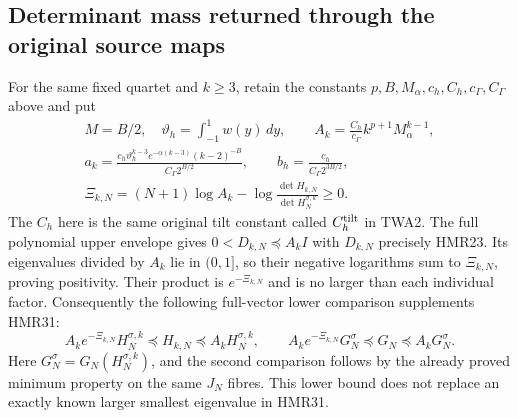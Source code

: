 \documentclass[11pt,a4paper]{article}
\begin{document}
\subsection{Determinant mass returned through the original source maps}

For the same fixed quartet and $k\geq3$, retain the constants
$p,B,M_\alpha,c_h,C_h,c_\Gamma,C_\Gamma$ above and put
\[
\begin{gathered}
 M=B/2,\quad \vartheta_h=\int_{-1}^1w(y)\,dy,\qquad
 A_k=\frac{C_h}{c_\Gamma}k^{p+1}M_\alpha^{k-1},\\
 a_k=\frac{c_h\vartheta_h^{k-3}e^{-\alpha(k-3)}(k-2)^{-B}}
                 {C_\Gamma2^{B/2}},\qquad
 b_h=\frac{c_h}{C_\Gamma2^{3B/2}},\\
 \Xi_{k,N}=(N+1)\log A_k
       -\log\frac{\det H_{k,N}}{\det H_N^{\sigma,k}}\geq0 .
\end{gathered}\tag{HMR36}
\]
The $C_h$ here is the same original tilt constant called
$C_h^{\rm tilt}$ in TWA2. The full polynomial upper envelope
gives $0<D_{k,N}\preceq A_kI$ with $D_{k,N}$ precisely HMR23.
Its eigenvalues divided by $A_k$ lie in $(0,1]$, so their
negative logarithms sum to $\Xi_{k,N}$, proving positivity.
Their product is $e^{-\Xi_{k,N}}$ and is no larger than each
individual factor. Consequently the following full-vector
lower comparison supplements HMR31:
\[
 A_ke^{-\Xi_{k,N}}H_N^{\sigma,k}
 \preceq H_{k,N}\preceq A_kH_N^{\sigma,k},\qquad
 A_ke^{-\Xi_{k,N}}G_N^\sigma
 \preceq G_N\preceq A_kG_N^\sigma .
 \tag{HMR37}
\]
Here $G_N^\sigma=G_N(H_N^{\sigma,k})$, and the second
comparison follows by the already proved minimum property
on the same $J_N$ fibres. This lower bound does not replace
an exactly known larger smallest eigenvalue in HMR31.
\end{document}
